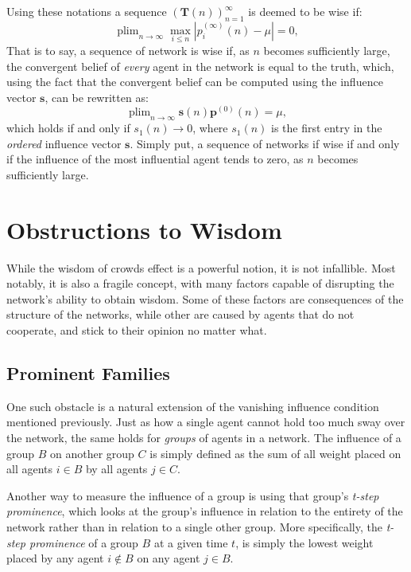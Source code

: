 \documentclass[a4paper, 12pt]{report}
\DeclareMathOperator*{\plim}{plim}
\newcommand{\T}{\bm{T}}
\newcommand{\Soc}{(\T(n))^{\infty}_{n=1}}
\newcommand{\beli}[3][2]{p_{#2}^{(#3)}}
\begin{document}
\noindent Using these notations a sequence $\Soc$ is deemed to be wise if:
\begin{equation*}
    \label{wisdom:equation}
    \plim_{n\to\infty}\max_{i \leq n}|\beli{i}{\infty}(n) - \mu| = 0,
\end{equation*}
That is to say, a sequence of network is wise if, as $n$ becomes sufficiently large, the convergent belief of \emph{every} agent in the network is equal to the truth, which, using the fact that the convergent belief can be computed using the influence vector $\bm{s}$, can be rewritten as:
\begin{equation*}
    \label{wisdom:influence}
    \plim_{n\to\infty} \textbf{s}(n)\bm{p}^{(0)}(n) = \mu,
\end{equation*}
which holds if and only if $s_{1}(n) \to 0$, where $s_1(n)$ is the first entry in the \emph{ordered} influence vector $\bm{s}$. Simply put, a sequence of networks if wise if and only if the influence of the most influential agent tends to zero, as $n$ becomes sufficiently large.

\newpage

\section{Obstructions to Wisdom}
While the wisdom of crowds effect is a powerful notion, it is not infallible. Most notably, it is also a fragile concept, with many factors capable of disrupting the network's ability to obtain wisdom. Some of these factors are consequences of the structure of the networks, while other are caused by agents that do not cooperate, and stick to their opinion no matter what.

\subsection{Prominent Families}

One such obstacle is a natural extension of the vanishing influence condition mentioned previously. Just as how a single agent cannot hold too much sway over the network, the same holds for \emph{groups} of agents in a network. The influence of a group $B$ on another group $C$ is simply defined as the sum of all weight placed on all agents $i \in B$ by all agents $j \in C$. 

\noindent Another way to measure the influence of a group is using that group's \emph{t-step prominence}, which looks at the group's influence in relation to the entirety of the network rather than in relation to a single other group. More specifically, the \emph{t-step prominence} of a group $B$ at a given time $t$, is simply the lowest weight placed by any agent $i \notin B$ on any agent $j \in B$.
\end{document}

